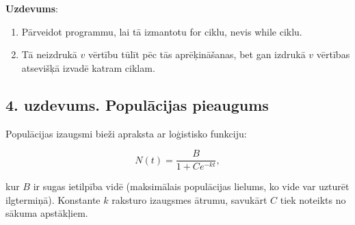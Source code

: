 \begin{Shaded}
\begin{Highlighting}[]

\OperatorTok{=} 
\OperatorTok{=}\NormalTok{ [}\NormalTok{, }\NormalTok{, }\NormalTok{, }\NormalTok{]}
\OperatorTok{=} 
\OperatorTok{=}\NormalTok{ [}\NormalTok{] }\OperatorTok{*}

\OperatorTok{=} 
\OperatorTok{\textless{}}
\OperatorTok{=}\OperatorTok{*}
\OperatorTok{=}\OperatorTok{*}  \OperatorTok{/}   
    \NormalTok{(} \OperatorTok{\%}
\OperatorTok{+=} 
\end{Highlighting}
\end{Shaded}

\textbf{Uzdevums}:

\begin{enumerate}
\def\labelenumi{\arabic{enumi}.}
\tightlist
\item
  Pārveidot programmu, lai tā izmantotu for ciklu, nevis while ciklu.
\item
  Tā neizdrukā \(v\) vērtību tūlīt pēc tās aprēķināšanas, bet gan
  izdrukā \(v\) vērtības atsevišķā izvadē katram ciklam.
\end{enumerate}

\subsection{4. uzdevums. Populācijas
pieaugums}\label{uzdevums.-populux101cijas-pieaugums}

Populācijas izaugsmi bieži apraksta ar loģistisko funkciju:

\[
N(t) = \frac{B}{1+C e^{-kt}},
\]

kur \(B\) ir sugas ietilpība vidē (maksimālais populācijas lielums, ko
vide var uzturēt ilgtermiņā). Konstante \(k\) raksturo izaugsmes ātrumu,
savukārt \(C\) tiek noteikts no sākuma apstākļiem.

